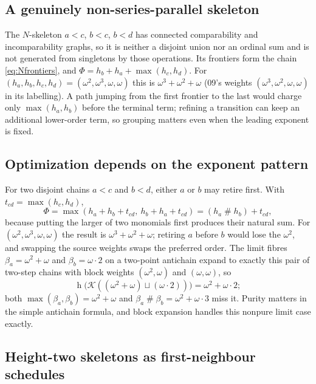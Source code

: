 \documentclass[11pt,a4paper]{article}
\theoremstyle{definition}
\theoremstyle{remark}
\newcommand{\K}{\mathcal K}
\newcommand{\hgt}{\operatorname{h}}
\newcommand{\ns}{\mathbin{\#}}
\begin{document}
\subsection{A genuinely non-series-parallel skeleton}

The $N$-skeleton $a<c$, $b<c$, $b<d$ has connected comparability and
incomparability graphs, so it is neither a disjoint union nor an ordinal sum and
is not generated from singletons by those operations. Its frontiers form the
chain \eqref{eq:Nfrontiers}, and $\Phi=h_b+h_a+\max(h_c,h_d)$. For
$(h_a,h_b,h_c,h_d)=(\omega^2,\omega^3,\omega,\omega)$ this is
$\omega^3+\omega^2+\omega$ (09's weights $(\omega^3,\omega^2,\omega,\omega)$ in
its labelling). A path jumping from the first frontier to the last would charge
only $\max(h_a,h_b)$ before the terminal term; refining a transition can keep an
additional lower-order term, so grouping matters even when the leading exponent
is fixed.

\subsection{Optimization depends on the exponent pattern}

For two disjoint chains $a<c$ and $b<d$, either $a$ or $b$ may retire first. With
$t_{cd}=\max(h_c,h_d)$,
\begin{equation}\label{nh:wpo:eq:parallel}
 \Phi=\max(h_a+h_b+t_{cd},\ h_b+h_a+t_{cd})=(h_a\ns h_b)+t_{cd},
\end{equation}
because putting the larger of two monomials first produces their natural sum. For
$(\omega^2,\omega^3,\omega,\omega)$ the result is $\omega^3+\omega^2+\omega$;
retiring $a$ before $b$ would lose the $\omega^2$, and swapping the source
weights swaps the preferred order. The limit fibres $\beta_a=\omega^2+\omega$ and
$\beta_b=\omega\cdot2$ on a two-point antichain expand to exactly this pair of
two-step chains with block weights $(\omega^2,\omega)$ and $(\omega,\omega)$, so
\begin{equation}\label{nh:wpo:eq:limitworked}
 \hgt\bigl(\K((\omega^2+\omega)\sqcup(\omega\cdot2))\bigr)=\omega^2+\omega\cdot2 ;
\end{equation}
both $\max(\beta_a,\beta_b)=\omega^2+\omega$ and
$\beta_a\ns\beta_b=\omega^2+\omega\cdot3$ miss it. Purity matters in the simple
antichain formula, and block expansion handles this nonpure limit case exactly.

\subsection{Height-two skeletons as first-neighbour schedules}
\end{document}
